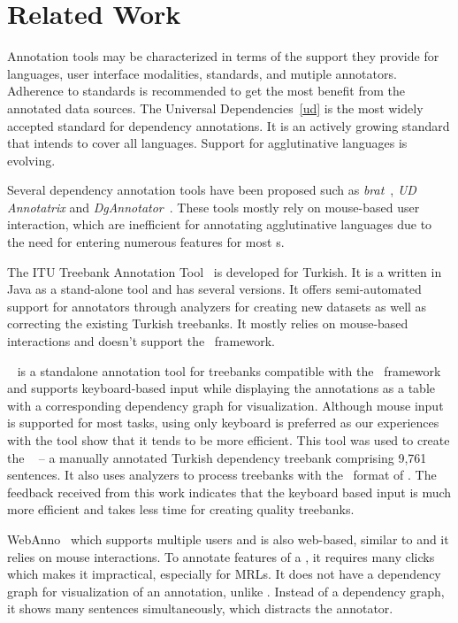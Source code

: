 \section{Related Work}
\label{sec:related}

Annotation tools may be characterized in terms of the support they provide for languages, user interface modalities, standards, and mutiple annotators. 
Adherence to standards is recommended to get the most benefit from the annotated data sources. 
The Universal Dependencies~\ref{ud} is the most widely accepted standard for dependency annotations. 
It is an actively growing standard that intends to cover  all languages. 
Support for agglutinative languages is evolving.


Several dependency annotation tools have been proposed such as \textit{brat}~\cite{brat}, \textit{UD Annotatrix} and \textit{DgAnnotator}~\cite{UD}.
These tools mostly rely on mouse-based user interaction, which are inefficient for annotating agglutinative languages due to the need for entering numerous features for  most \form s.

The ITU Treebank Annotation Tool~\cite{pamay-etal-2015-annotation} is developed for Turkish. 
It is a written in Java as a stand-alone tool and has several versions.
It offers semi-automated support for annotators through analyzers for creating new datasets as well as correcting the existing Turkish treebanks.
It mostly relies on mouse-based interactions and doesn't support the \ud\ framework. 



\boatvone~\cite{turk-etal-2019-turkish} is a standalone annotation tool for treebanks compatible with the \ud\ framework~\cite{UD} and supports keyboard-based input while displaying the annotations as a table with a corresponding dependency graph for visualization.
Although mouse input is supported for most tasks, using only keyboard is preferred as our experiences with the tool show that it tends to be more efficient.
This tool was used to create the \bountreebank~\cite{turk2021resources,UD-Boun-Treebank} -- a manually annotated Turkish dependency treebank comprising 9,761 sentences.
It also uses analyzers to process treebanks with the \conllu\ format of \ud. 
The feedback received from this work indicates that the keyboard based input is much more efficient and takes less time for creating quality treebanks.

WebAnno~\cite{webanno} which supports multiple users and is also web-based, similar to \boatvtwo and it relies on mouse interactions.
To annotate features of a \form, it requires many clicks which makes it impractical, especially for MRLs.
It does not have a dependency graph for visualization of an annotation, unlike \boatvone. Instead of a dependency graph, it shows many sentences simultaneously, which distracts the annotator.

